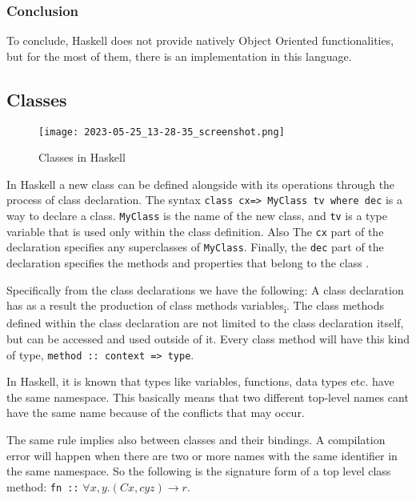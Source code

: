 \documentclass[a4paper, titlepage, twoside]{article}
\begin{document}
\subsubsection{Conclusion}
\label{sec:org2b25cb8}

To conclude, Haskell does not provide natively Object Oriented functionalities, but for the most of them, there is an implementation in this language.

\subsection{Classes}
\label{sec:orgfab32d6}

\begin{figure}[htbp]
\centering
\texttt{[image: 2023-05-25\_13-28-35\_screenshot.png]}
\caption{\label{fig:org6eaafae}Classes in Haskell}
\end{figure}

In Haskell a new class can be defined alongside with its operations through the process of class declaration. The syntax \texttt{class cx=> MyClass tv where dec} is a way to declare a class. \texttt{MyClass} is the name of the new class, and \texttt{tv} is a type variable that is used only within the class definition. Also The \texttt{cx} part of the declaration specifies any superclasses of \texttt{MyClass}. Finally, the \texttt{dec} part of the declaration specifies the methods and properties that belong to the class \autocite[chapter 4.3]{marlowHaskell2010Language2010}.

Specifically from the class declarations we have the following: A class declaration has as a result the production of class methods variables\textsubscript{i}. The class methods defined within the class declaration are not limited to the class declaration itself, but can be accessed and used outside of it. Every class method will have this kind of type, \texttt{method :: context => type}.

In Haskell, it is known that types like variables, functions, data types etc. have the same namespace. This basically means that two different top-level names cant have the same name because of the conflicts that may occur.

The same rule implies also between classes and their bindings. A compilation error will happen when there are two or more names with the same identifier in the same namespace. So the following is the signature form of a top level class method: \texttt{fn ::} \(\forall x, y. (Cx, cyz) \rightarrow r\).
\end{document}
